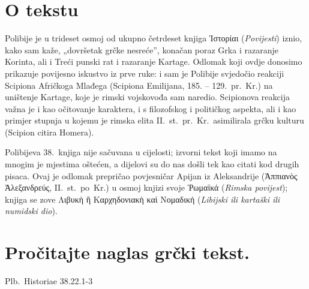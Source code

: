 
\section*{O tekstu}

Polibije je u trideset osmoj od ukupno četrdeset knjiga \textgreek[variant=ancient]{Ἱστορίαι} (\textit{Povijesti}) iznio, kako sam kaže, „dovršetak grčke nesreće”, konačan poraz Grka i razaranje Korinta, ali i Treći punski rat i razaranje Kartage. Odlomak koji ovdje donosimo prikazuje povijesno iskustvo iz prve ruke: i sam je Polibije svjedočio reakciji Scipiona Afričkoga Mlađega (Scipiona Emilijana, 185. – 129.\ pr.~Kr.) na uništenje Kartage, koje je rimski vojskovođa sam naredio. Scipionova reakcija važna je i kao očitovanje karaktera, i s filozofskog i političkog aspekta, ali i kao primjer stupnja u kojemu je rimska elita II.~st.\ pr.~Kr.\ asimilirala grčku kulturu (Scipion citira Homera).

Polibijeva 38.\ knjiga nije sačuvana u cijelosti; izvorni tekst koji imamo na mnogim je mjestima oštećen, a dijelovi su do nas došli tek kao citati kod drugih pisaca. Ovaj je odlomak prepričao povjesničar Apijan iz Aleksandrije \textgreek[variant=ancient]{(Ἀππιανὸς Ἀλεξανδρεύς,} II.~st.\ po~Kr.) u osmoj knjizi svoje \textgreek[variant=ancient]{Ῥωμαϊκά} (\textit{Rimska povijest}); knjiga se zove \textgreek[variant=ancient]{Λιβυκὴ ἢ Καρχηδονιακὴ καὶ Νομαδική} (\textit{Libijski ili kartaški ili numidski dio}).

\newpage

\section*{Pročitajte naglas grčki tekst.}

Plb.\ Historiae 38.22.1-3


\medskip


